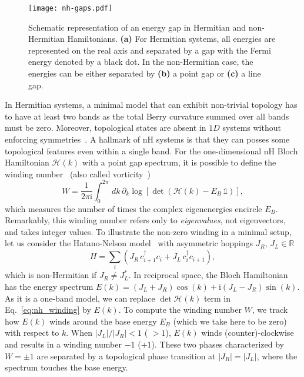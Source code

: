 \begin{figure}[H]
\centering
\texttt{[image: nh-gaps.pdf]}
\caption[Schematic representation of an energy gap in Hermitian and non-Hermitian Hamiltonians.]{Schematic representation of an energy gap in Hermitian and non-Hermitian Hamiltonians. \textbf{(a)} For Hermitian systems, all energies are represented on the real axis and separated by a gap with the Fermi energy denoted by a black dot. In the non-Hermitian case, the energies can be either separated by \textbf{(b)} a point gap or \textbf{(c)} a line gap.}
\label{fig:gaps}
\end{figure}

In Hermitian systems, a minimal model that can exhibit non-trivial topology has to have at least two bands as the total Berry curvature summed over all bands must be zero. Moreover, topological states are absent in $1D$ systems without enforcing symmetries~\cite{RevModPhys.82.3045, RevModPhys.83.1057}. A hallmark of nH systems is that they can posses some topological features even within a single band. For the one-dimensional nH Bloch Hamiltonian $\mathcal{H} (k)$ with a point gap spectrum, it is possible to define the winding number~\cite{okuma2019topological} (also called vorticity~\cite{PhysRevLett.120.146402})
\begin{equation}
W = \frac{1}{2 \pi \mathrm{i}} \int_{0}^{2 \pi} \, d k \,   \partial_k \log \left[ \det (\mathcal{H}(k) - E_B \, \mathbb{1} ) \right],
\label{eq:nh_winding}
\end{equation}
which measures the number of times the complex eigenenergies encircle $E_B$. Remarkably, this winding number refers only to \emph{eigenvalues}, not eigenvectors, and takes integer values. To illustrate the non-zero winding in a minimal setup, let us consider the Hatano-Nelson model~\cite{hatano-nelson} with asymmetric hoppings $J_R, \, J_L \in \mathbb{R}$
\begin{equation}
H = \sum_i ( J_R \,  c^{\dagger}_{i +1}  c_i + J_L \, c^{\dagger}_i c_{i +1} ), 
\label{eq:hatano-nelson}
\end{equation}
which is non-Hermitian if $J_R \neq J_L^*$. In reciprocal space, the Bloch Hamiltonian has the energy spectrum $E(k) = (J_L + J_R) \cos(k) + \mathrm{i} (J_L - J_R) \sin(k)$. As it is a one-band model, we can replace $\det \mathcal{H} (k)$ term in Eq.~\eqref{eq:nh_winding} by $E(k)$. To compute the winding number $W$, we track how $E(k)$ winds around the base energy $E_B$ (which we take here to be zero) with respect to $k$. When $|J_L| / | J_R | < 1$ ( $>1$), $E(k)$ winds (counter)-clockwise and results in a winding number $-1$ ($+1$). These two phases characterized by $W = \pm 1$ are separated by a topological phase transition at $|J_R| = |J_L|$, where the spectrum touches the base energy.  

